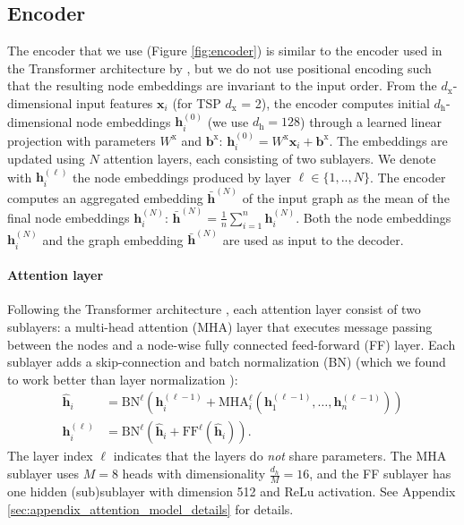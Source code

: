 \subsection{Encoder}
The encoder that we use (Figure \ref{fig:encoder}) is similar to the encoder used in the Transformer architecture by \citet{vaswani2017attention}, but we do not use positional encoding such that the resulting node embeddings are invariant to the input order. From the $d_{\text{x}}$-dimensional input features $\mathbf{x}_i$ (for TSP $d_{\text{x}}$ = 2), the encoder computes initial $d_{\text{h}}$-dimensional node embeddings $\mathbf{h}_i^{(0)}$ (we use $d_{\text{h}} = 128$) through a learned linear projection with parameters $W^{\text{x}}$ and $\mathbf{b}^{\text{x}}$: $\mathbf{h}_i^{(0)} = W^{\text{x}} \mathbf{x}_i + \mathbf{b}^{\text{x}}$.
The embeddings are updated using $N$ attention layers, each consisting of two sublayers. We denote with $\mathbf{h}_i^{(\ell)}$ the node embeddings produced by layer $\ell \in \{1, .., N\}$. The encoder computes an aggregated embedding $\bar{\mathbf{h}}^{(N)}$ of the input graph  as the mean of the final node embeddings $\mathbf{h}_i^{(N)}$: $\bar{\mathbf{h}}^{(N)} = \frac{1}{n} \sum_{i = 1}^n \mathbf{h}_i^{(N)}$.
Both the node embeddings $\mathbf{h}_i^{(N)}$ and the graph embedding $\bar{\mathbf{h}}^{(N)}$ are used as input to the decoder.

\paragraph{Attention layer}
Following the Transformer architecture \citep{vaswani2017attention}, each attention layer consist of two sublayers: a multi-head attention (MHA) layer that executes message passing between the nodes and a node-wise fully connected feed-forward (FF) layer. Each sublayer adds a skip-connection \citep{he2016deep} and batch normalization (BN) \citep{ioffe2015batch} (which we found to work better than layer normalization \citep{ba2016layer}): 
\begin{align}
	 \hat{\mathbf{h}}_i & =\text{BN}^{\ell}\left( \mathbf{h}_i^{(\ell-1)} + \text{MHA}_i^{\ell}\left( \mathbf{h}_1^{(\ell-1)}, \ldots, \mathbf{h}_n^{(\ell-1)}\right)\right) \label{eq:attn_sublayer1} \\
    \mathbf{h}_i^{(\ell)} & =\text{BN}^{\ell}\left(\hat{\mathbf{h}}_i + \text{FF}^{\ell}(\hat{\mathbf{h}}_i)\right). \label{eq:attn_sublayer2}
\end{align}
The layer index $\ell$ indicates that the layers do \emph{not} share parameters. The MHA sublayer uses $M = 8$ heads with dimensionality $\frac{d_h}{M}=16$, and the FF sublayer has one hidden (sub)sublayer with dimension 512 and ReLu activation. See Appendix \ref{sec:appendix_attention_model_details} for details.


